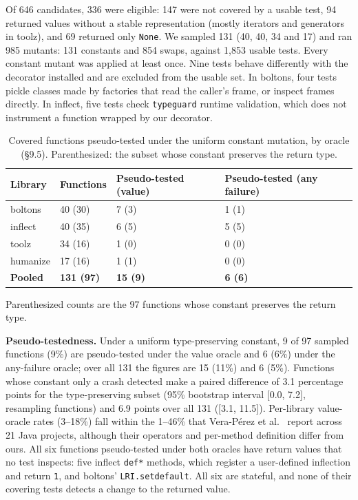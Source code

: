 \documentclass[conference]{IEEEtran}
\theoremstyle{run}
\begin{document}
Of 646 candidates, 336 were eligible: 147 were not covered by a usable test, 94 returned values without a stable representation (mostly iterators and generators in toolz), and 69 returned only \texttt{None}. We sampled 131 (40, 40, 34 and 17) and ran 985 mutants: 131 constants and 854 swaps, against 1,853 usable tests. Every constant mutant was applied at least once. Nine tests behave differently with the decorator installed and are excluded from the usable set. In boltons, four tests pickle classes made by factories that read the caller's frame, or inspect frames directly. In inflect, five tests check \texttt{typeguard} runtime validation, which does not instrument a function wrapped by our decorator.

\begin{table}[!t]\centering\footnotesize
\caption{Covered functions pseudo-tested under the uniform constant mutation, by oracle (\S 9.5). Parenthesized: the subset whose constant preserves the return type.}
\label{tab:pseudo}
\begin{tabular}{lL{1.3cm}L{1.6cm}L{1.9cm}}
\toprule
Library & Functions & Pseudo-tested (value) & Pseudo-tested (any failure) \\
\midrule
boltons & 40 (30) & 7 (3) & 1 (1) \\
inflect & 40 (35) & 6 (5) & 5 (5) \\
toolz & 34 (16) & 1 (0) & 0 (0) \\
humanize & 17 (16) & 1 (1) & 0 (0) \\
\textbf{Pooled} & \textbf{131 (97)} & \textbf{15 (9)} & \textbf{6 (6)} \\
\bottomrule
\end{tabular}
\end{table}

Parenthesized counts are the 97 functions whose constant preserves the return type.

\textbf{Pseudo-testedness.} Under a uniform type-preserving constant, 9 of 97 sampled functions (9\%) are pseudo-tested under the value oracle and 6 (6\%) under the any-failure oracle; over all 131 the figures are 15 (11\%) and 6 (5\%). Functions whose constant only a crash detected make a paired difference of 3.1 percentage points for the type-preserving subset (95\% bootstrap interval [0.0, 7.2], resampling functions) and 6.9 points over all 131 ([3.1, 11.5]). Per-library value-oracle rates (3--18\%) fall within the 1--46\% that Vera-P\'{e}rez et al.~\cite{veraperez2019} report across 21 Java projects, although their operators and per-method definition differ from ours. All six functions pseudo-tested under both oracles have return values that no test inspects: five inflect \texttt{def*} methods, which register a user-defined inflection and return \texttt{1}, and boltons' \texttt{LRI.setdefault}. All six are stateful, and none of their covering tests detects a change to the returned value.
\end{document}
